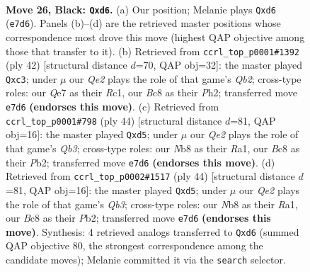 \documentclass[11pt]{article}
\begin{document}
\clearpage

\begin{figure}[p]\centering
\begin{subfigure}{0.46\textwidth}\centering
\resizebox{\linewidth}{!}{%
\newchessgame
\chessboard[
  setfen={rnb5/pp2q1k1/2pN2p1/6pp/2BP4/P4PP1/1P2R2P/2RQ2K1 b - - 0 26},
  showmover=false,
  pgfstyle=straightmove, color=movearrow, markmove={e7-d6}
]}
\caption{}
\end{subfigure}\hfill
\begin{subfigure}{0.46\textwidth}\centering
\resizebox{\linewidth}{!}{%
\newchessgame
\chessboard[
  setfen={5r1k/pb2qpp1/1p1b3p/3p1B2/8/1Pn1PN2/PQ3PPP/2R3K1 w - - 0 22},
  showmover=false,
  pgfstyle=straightmove, color=movearrow, markmove={b2-c3}
]}
\caption{}
\end{subfigure}
\\[4pt]
\begin{subfigure}{0.46\textwidth}\centering
\resizebox{\linewidth}{!}{%
\newchessgame
\chessboard[
  setfen={5rk1/ppq2p1p/3b2p1/3n1p2/P7/1Q2PNP1/1P3P1P/R5K1 w - - 0 23},
  showmover=false,
  pgfstyle=straightmove, color=movearrow, markmove={b3-d5}
]}
\caption{}
\end{subfigure}\hfill
\begin{subfigure}{0.46\textwidth}\centering
\resizebox{\linewidth}{!}{%
\newchessgame
\chessboard[
  setfen={5rk1/ppq2p1p/3b2p1/3n1p2/P7/1Q2PNP1/1P3P1P/R5K1 w - - 0 23},
  showmover=false,
  pgfstyle=straightmove, color=movearrow, markmove={b3-d5}
]}
\caption{}
\end{subfigure}
\caption{\textbf{Move 26, Black: \texttt{Qxd6}.} (a) Our position; Melanie plays \texttt{Qxd6} (\texttt{e7d6}). Panels (b)--(d) are the retrieved master positions whose correspondence most drove this move (highest QAP objective among those that transfer to it). (b) Retrieved from \texttt{ccrl\_top\_p0001\#1392} (ply 42) [structural distance $d$=70, QAP obj=32]: the master played \texttt{Qxc3}; under $\mu$ our \emph{Qe2} plays the role of that game's \emph{Qb2}; cross-type roles: our \emph{Q}e7 as their \emph{R}c1, our \emph{B}c8 as their \emph{P}h2; transferred move \texttt{e7d6} \textbf{(endorses this move)}. (c) Retrieved from \texttt{ccrl\_top\_p0001\#798} (ply 44) [structural distance $d$=81, QAP obj=16]: the master played \texttt{Qxd5}; under $\mu$ our \emph{Qe2} plays the role of that game's \emph{Qb3}; cross-type roles: our \emph{N}b8 as their \emph{R}a1, our \emph{B}c8 as their \emph{P}b2; transferred move \texttt{e7d6} \textbf{(endorses this move)}. (d) Retrieved from \texttt{ccrl\_top\_p0002\#1517} (ply 44) [structural distance $d$=81, QAP obj=16]: the master played \texttt{Qxd5}; under $\mu$ our \emph{Qe2} plays the role of that game's \emph{Qb3}; cross-type roles: our \emph{N}b8 as their \emph{R}a1, our \emph{B}c8 as their \emph{P}b2; transferred move \texttt{e7d6} \textbf{(endorses this move)}. Synthesis: 4 retrieved analogs transferred to \texttt{Qxd6} (summed QAP objective 80, the strongest correspondence among the candidate moves); Melanie committed it via the \texttt{search} selector.}
\label{fig:thought-m51}
\end{figure}
\end{document}
